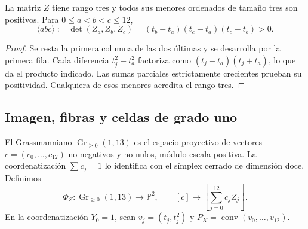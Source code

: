 \begin{proposition}
\label{prop:polygon-vandermonde}
La matriz \(Z\) tiene rango tres y todos sus menores ordenados de tamaño
tres son positivos. Para \(0\leq a<b<c\leq12\),
\begin{equation}
 \langle abc\rangle:=\det(Z_a,Z_b,Z_c)
 =(t_b-t_a)(t_c-t_a)(t_c-t_b)>0.
 \label{eq:polygon-minors}
\end{equation}
\end{proposition}
\begin{proof}
Se resta la primera columna de las dos últimas y se desarrolla por la
primera fila. Cada diferencia \(t_j^2-t_a^2\) factoriza como
\((t_j-t_a)(t_j+t_a)\), lo que da el producto indicado. Las sumas parciales
estrictamente crecientes prueban su positividad. Cualquiera de esos
menores acredita el rango tres.
\end{proof}

\subsection{Imagen, fibras y celdas de grado uno}

El Grassmanniano \(\operatorname{Gr}_{\geq0}(1,13)\) es el espacio
proyectivo de vectores \(c=(c_0,\ldots,c_{12})\) no negativos y no nulos,
módulo escala positiva. La coordenatización \(\sum c_j=1\) lo identifica con el
símplex cerrado de dimensión doce. Definimos
\begin{equation}
 \Phi_Z:\operatorname{Gr}_{\geq0}(1,13)\longrightarrow\mathbb P^2,
 \qquad[c]\longmapsto\left[\sum_{j=0}^{12}c_jZ_j\right].
 \label{eq:polygon-map}
\end{equation}
En la coordenatización \(Y_0=1\), sean \(v_j=(t_j,t_j^2)\) y
\(P_K=\operatorname{conv}(v_0,\ldots,v_{12})\).

